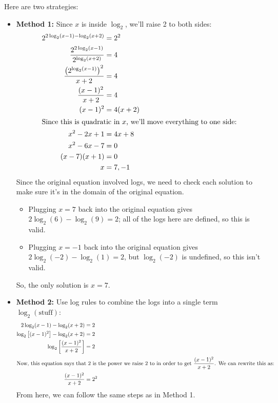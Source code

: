 \documentclass{article}
\theoremstyle{theorem}
\begin{document}
\begin{enumerate}[resume]
\begin{enumerate}
    \begin{solution}
      Here are two strategies:
      \begin{itemize}
      \item \textbf{Method 1:} Since $x$ is inside $\log_2$, we'll raise 2 to both sides:
        \begin{align*}
          2^{2\log_2(x - 1) - \log_2(x + 2)} &= 2^2 \\
          \dfrac{2^{2 \log_2(x - 1)}}{2^{\log_2(x + 2)}} &= 4 \\
          \dfrac{\left( 2^{\log_2 (x - 1)} \right)^2}{x + 2} &= 4 \\
          \dfrac{(x - 1)^2}{x + 2} &= 4 \\
          (x - 1)^2 &= 4 (x + 2) \\
          \intertext{Since this is quadratic in $x$, we'll move everything to one side:}
          x^2 - 2x + 1 &= 4x + 8 \\
          x^2 - 6x - 7 &= 0 \\
          (x - 7)(x + 1) &= 0 \\
          x &= 7, -1
        \end{align*}
        Since the original equation involved logs, we need to check each solution to make sure it's in the domain of the original equation.
        \begin{itemize}
        \item Plugging $x = 7$ back into the original equation gives $2 \log_2 (6) - \log_2(9) = 2$; all of the logs here are defined, so this is valid.
        \item Plugging $x = -1$ back into the original equation gives $2 \log_2(-2) - \log_2(1) = 2$, but $\log_2(-2)$ is undefined, so this isn't valid.
        \end{itemize}
        So, the only solution is $x = \boxed{7}$.

      \item \textbf{Method 2:} Use log rules to combine the logs into a single term $\log_2(\text{stuff})$:
        \begin{align*}
          2 \log_2(x - 1) - \log_2 (x + 2) &= 2 \\
          \log_2\left[ (x-1)^2\right] - \log_2(x + 2) &= 2 \\
          \log_2 \left[ \frac{(x-1)^2}{x + 2} \right] &= 2 \\
          \intertext{Now, this equation says that $2$ is the power we raise 2 to in order to get $\dfrac{(x-1)^2}{x + 2}$. We can rewrite this as:}
          \frac{(x-1)^2}{x + 2} &= 2^2 
        \end{align*}
        From here, we can follow the same steps as in Method 1.


\end{itemize}
\end{solution}
\end{enumerate}
\end{enumerate}
\end{document}
